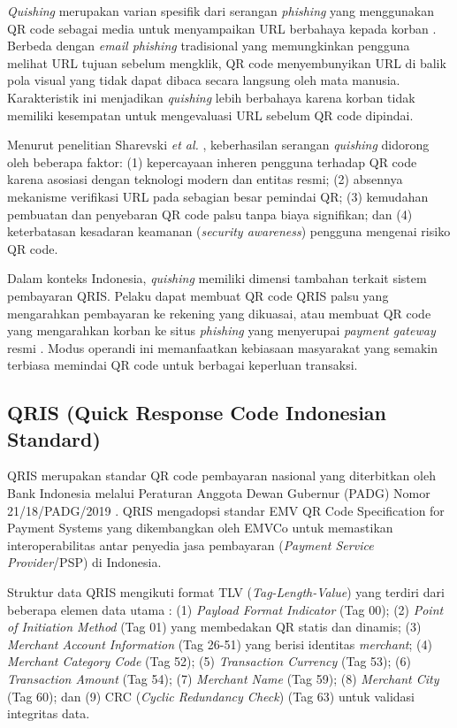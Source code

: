\documentclass[conference]{IEEEtran}
\begin{document}
\textit{Quishing} merupakan varian spesifik dari serangan \textit{phishing} yang menggunakan QR code sebagai media untuk menyampaikan URL berbahaya kepada korban \cite{sharevski_qr_2022}. Berbeda dengan \textit{email phishing} tradisional yang memungkinkan pengguna melihat URL tujuan sebelum mengklik, QR code menyembunyikan URL di balik pola visual yang tidak dapat dibaca secara langsung oleh mata manusia. Karakteristik ini menjadikan \textit{quishing} lebih berbahaya karena korban tidak memiliki kesempatan untuk mengevaluasi URL sebelum QR code dipindai.

Menurut penelitian Sharevski \textit{et al.} \cite{sharevski_qr_2022}, keberhasilan serangan \textit{quishing} didorong oleh beberapa faktor: (1) kepercayaan inheren pengguna terhadap QR code karena asosiasi dengan teknologi modern dan entitas resmi; (2) absennya mekanisme verifikasi URL pada sebagian besar pemindai QR; (3) kemudahan pembuatan dan penyebaran QR code palsu tanpa biaya signifikan; dan (4) keterbatasan kesadaran keamanan (\textit{security awareness}) pengguna mengenai risiko QR code.

Dalam konteks Indonesia, \textit{quishing} memiliki dimensi tambahan terkait sistem pembayaran QRIS. Pelaku dapat membuat QR code QRIS palsu yang mengarahkan pembayaran ke rekening yang dikuasai, atau membuat QR code yang mengarahkan korban ke situs \textit{phishing} yang menyerupai \textit{payment gateway} resmi \cite{kompas_qris_2023}. Modus operandi ini memanfaatkan kebiasaan masyarakat yang semakin terbiasa memindai QR code untuk berbagai keperluan transaksi.

\subsection{QRIS (Quick Response Code Indonesian Standard)}

QRIS merupakan standar QR code pembayaran nasional yang diterbitkan oleh Bank Indonesia melalui Peraturan Anggota Dewan Gubernur (PADG) Nomor 21/18/PADG/2019 \cite{bi_qris_2019}. QRIS mengadopsi standar EMV QR Code Specification for Payment Systems yang dikembangkan oleh EMVCo untuk memastikan interoperabilitas antar penyedia jasa pembayaran (\textit{Payment Service Provider}/PSP) di Indonesia.

Struktur data QRIS mengikuti format TLV (\textit{Tag-Length-Value}) yang terdiri dari beberapa elemen data utama \cite{emvco_qr_2020}: (1) \textit{Payload Format Indicator} (Tag 00); (2) \textit{Point of Initiation Method} (Tag 01) yang membedakan QR statis dan dinamis; (3) \textit{Merchant Account Information} (Tag 26-51) yang berisi identitas \textit{merchant}; (4) \textit{Merchant Category Code} (Tag 52); (5) \textit{Transaction Currency} (Tag 53); (6) \textit{Transaction Amount} (Tag 54); (7) \textit{Merchant Name} (Tag 59); (8) \textit{Merchant City} (Tag 60); dan (9) CRC (\textit{Cyclic Redundancy Check}) (Tag 63) untuk validasi integritas data.
\end{document}
